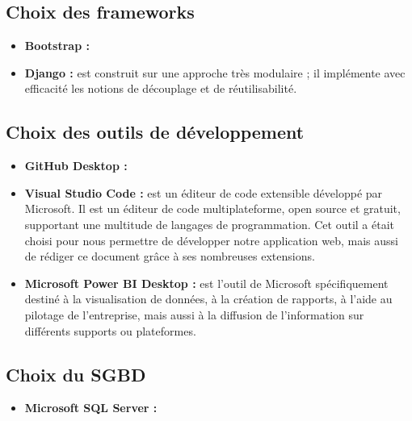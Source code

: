         \subsection[Choix des frameworks]{Choix des frameworks}
            \begin{itemize}
                \setlength{\itemsep}{0pt}
                \item [\ding{226}] \textbf{Bootstrap :}
                \item [\ding{226}] \textbf{Django :} est construit sur une approche très modulaire ; il implémente avec efficacité
                les notions de découplage et de réutilisabilité.
            \end{itemize}
        \subsection[Choix des outils de développement]{Choix des outils de développement}
            \begin{itemize}
                \setlength{\itemsep}{0pt}
                \item [\ding{226}] \textbf{GitHub Desktop :}
                \item [\ding{226}] \textbf{Visual Studio Code :} est un éditeur de code
                extensible développé par Microsoft. Il est un éditeur de code multiplateforme, open source et gratuit,
                supportant une multitude de langages de programmation. \cite*{Wikivsc} Cet outil a était choisi
                pour nous permettre de développer notre application web, mais aussi de rédiger ce document grâce à
                ses nombreuses extensions.
                \item [\ding{226}] \textbf{Microsoft Power BI Desktop :} est l’outil de Microsoft spécifiquement destiné à la visualisation de
                données, à la création de rapports, à l’aide au pilotage de l’entreprise, mais aussi à la
                diffusion de l’information sur différents supports ou plateformes. \cite*{Meyer2021}
            \end{itemize}
        \subsection[Choix du SGBD]{Choix du SGBD}
            \begin{itemize}
                \setlength{\itemsep}{0pt}
                \item [\ding{226}] \textbf{Microsoft SQL Server :}
            \end{itemize}
